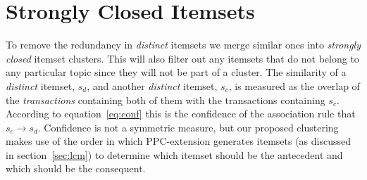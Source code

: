 \documentclass[letterpaper,12pt,titlepage,oneside,final]{book}
\begin{document}



\normalsize

\section{Strongly Closed Itemsets}
To remove the redundancy in \emph{distinct} itemsets we merge similar ones
into \emph{strongly closed} itemset clusters.
This will also filter out any itemsets %
that do not belong to any particular topic
since they will not be part of a cluster.
The similarity of a \emph{distinct} itemset,
$s_d$, and another \emph{distinct} itemset, $s_c$, %
is measured as the overlap of the \emph{transactions} containing both of them
with the transactions containing $s_c$. 
According to equation~\ref{eq:conf} this is the confidence
of the association rule that $s_c \rightarrow s_d$.
Confidence is not a symmetric measure,
but our proposed clustering makes use of the order
in which PPC-extension generates itemsets 
(as discussed in section~\ref{sec:lcm})
to determine which itemset should be the antecedent 
and which should be the consequent.
\end{document}
